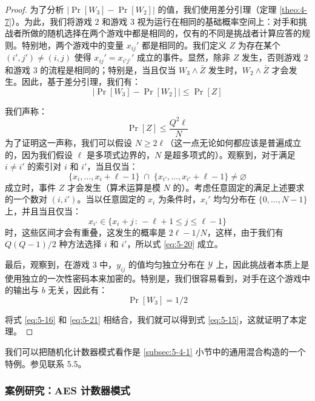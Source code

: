 \begin{proof}
\vspace{5pt}

为了分析 $|\Pr[W_3]-\Pr[W_2]|$ 的值，我们使用差分引理（定理 \ref{theo:4-7}）。为此，我们将游戏 $2$ 和游戏 $3$ 视为运行在相同的基础概率空间上：对手和挑战者所做的随机选择在两个游戏中都是相同的，仅有的不同是挑战者计算应答的规则。特别地，两个游戏中的变量 $x_{ij}'$ 都是相同的。我们定义 $Z$ 为存在某个 $(i',j')\neq(i,j)$ 使得 $x_{ij}'=x_{i'j'}'$ 成立的事件。显然，除非 $Z$ 发生，否则游戏 $2$ 和游戏 $3$ 的流程是相同的；特别是，当且仅当 $W_3\land\bar{Z}$ 发生时，$W_2\land\bar{Z}$ 才会发生。因此，基于差分引理，我们有：
\begin{equation}\label{eq:5-19}
|\Pr[W_3]-\Pr[W_2]|\leq\Pr[Z]
\end{equation}

我们声称：
\begin{equation}\label{eq:5-20}
\Pr[Z]\leq\frac{Q^2\ell}{N}
\end{equation}
为了证明这一声称，我们可以假设 $N\geq2\ell$（这一点无论如何都应该是普遍成立的，因为我们假设 $\ell	$ 是多项式边界的，$N$ 是超多项式的）。观察到，对于满足 $i\neq i'$ 的索引对 $i$ 和 $i'$，当且仅当：
\[
\{x_i,\dots,x_i+\ell-1\}
\;\cap\;
\{x_{i'},\dots,x_{i'}+\ell-1\}
\neq\varnothing
\]
成立时，事件 $Z$ 才会发生（算术运算是模 $N$ 的）。考虑任意固定的满足上述要求的一个数对 $(i,i')$。当以任意固定的 $x_i$ 为条件时，$x_i'$ 均匀分布在 $\{0,\dots,N-1\}$ 上，并且当且仅当：
\[
x_{i'}\in\{x_i+j\,:\,-\ell+1\leq j\leq\ell-1\}
\]
时，这些区间才会有重叠，这发生的概率是 ${2\ell-1}/{N}$，这样，由于我们有 ${Q(Q-1)}/{2}$ 种方法选择 $i$ 和 $i'$，所以式 \ref{eq:5-20} 成立。

最后，观察到，在游戏 $3$ 中，$y_{ij}$ 的值均匀独立分布在 $\mathcal{Y}$ 上，因此挑战者本质上是使用独立的一次性密码本来加密的。特别是，我们很容易看到，对手在这个游戏中的输出与 $b$ 无关，因此有：
\begin{equation}\label{eq:5-21}
\Pr[W_3]={1}/{2}
\end{equation}

将式 \ref{eq:5-16} 和 \ref{eq:5-21} 相结合，我们就可以得到式 \ref{eq:5-15}，这就证明了本定理。
\end{proof}

\begin{remark}\label{remark:5-3}
我们可以把随机化计数器模式看作是 \ref{subsec:5-4-1} 小节中的通用混合构造的一个特例。参见联系 5.5。
\end{remark}

\subsubsection{案例研究：AES 计数器模式}

